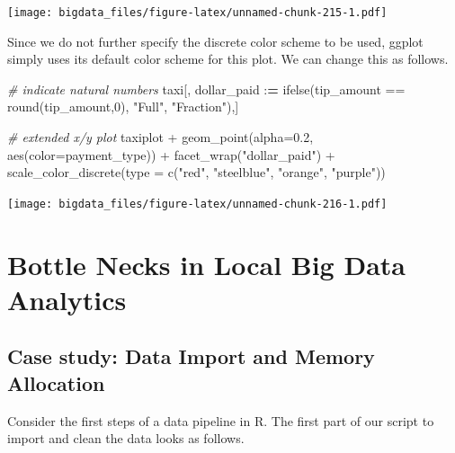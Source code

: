 \documentclass[
  12pt,
]{style/krantz}
\newenvironment{Shaded}{\begin{snugshade}}{\end{snugshade}}
\newcommand{\AttributeTok}[1]{\textcolor[rgb]{0.77,0.63,0.00}{#1}}
\newcommand{\CommentTok}[1]{\textcolor[rgb]{0.56,0.35,0.01}{\textit{#1}}}
\newcommand{\DecValTok}[1]{\textcolor[rgb]{0.00,0.00,0.81}{#1}}
\newcommand{\ErrorTok}[1]{\textcolor[rgb]{0.64,0.00,0.00}{\textbf{#1}}}
\newcommand{\FloatTok}[1]{\textcolor[rgb]{0.00,0.00,0.81}{#1}}
\newcommand{\FunctionTok}[1]{\textcolor[rgb]{0.00,0.00,0.00}{#1}}
\newcommand{\NormalTok}[1]{#1}
\newcommand{\SpecialCharTok}[1]{\textcolor[rgb]{0.00,0.00,0.00}{#1}}
\newcommand{\StringTok}[1]{\textcolor[rgb]{0.31,0.60,0.02}{#1}}
\begin{document}
\texttt{[image: bigdata\_files/figure-latex/unnamed-chunk-215-1.pdf]}

Since we do not further specify the discrete color scheme to be used, ggplot simply uses its default color scheme for this plot. We can change this as follows.

\begin{Shaded}
\begin{Highlighting}[]
\CommentTok{\# indicate natural numbers}
\NormalTok{taxi[, dollar\_paid }\SpecialCharTok{:}\ErrorTok{=} \FunctionTok{ifelse}\NormalTok{(tip\_amount }\SpecialCharTok{==} \FunctionTok{round}\NormalTok{(tip\_amount,}\DecValTok{0}\NormalTok{), }\StringTok{"Full"}\NormalTok{, }\StringTok{"Fraction"}\NormalTok{),]}


\CommentTok{\# extended x/y plot}
\NormalTok{taxiplot }\SpecialCharTok{+}
     \FunctionTok{geom\_point}\NormalTok{(}\AttributeTok{alpha=}\FloatTok{0.2}\NormalTok{, }\FunctionTok{aes}\NormalTok{(}\AttributeTok{color=}\NormalTok{payment\_type)) }\SpecialCharTok{+}
     \FunctionTok{facet\_wrap}\NormalTok{(}\StringTok{"dollar\_paid"}\NormalTok{) }\SpecialCharTok{+}
     \FunctionTok{scale\_color\_discrete}\NormalTok{(}\AttributeTok{type =} \FunctionTok{c}\NormalTok{(}\StringTok{"red"}\NormalTok{, }\StringTok{"steelblue"}\NormalTok{, }\StringTok{"orange"}\NormalTok{, }\StringTok{"purple"}\NormalTok{))}
\end{Highlighting}
\end{Shaded}

\texttt{[image: bigdata\_files/figure-latex/unnamed-chunk-216-1.pdf]}

\hypertarget{bottle-necks-in-local-big-data-analytics}{%
\chapter{Bottle Necks in Local Big Data Analytics}\label{bottle-necks-in-local-big-data-analytics}}

\hypertarget{case-study-data-import-and-memory-allocation}{%
\section{Case study: Data Import and Memory Allocation}\label{case-study-data-import-and-memory-allocation}}

Consider the first steps of a data pipeline in R. The first part of our script to import and clean the data looks as follows.
\end{document}
